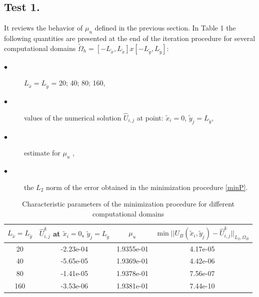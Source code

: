 \documentclass[12pt]{article}
\theoremstyle{theorem}
\theoremstyle{defi}
\begin{document}
\subsection{Test 1.}

It reviews the behavior of $\mu_u$  defined in the previous section. In Table 1 the following quantities are presented at the end of the iteration procedure for several computational domains $\tilde \Omega_h = [-L_{\tilde x}, L_{\tilde x}] x  [-L_{\tilde y}, L_{\tilde y}]$:

\begin{description}
  \item[$\bullet$ ] $ L_{\tilde x} = L_{\tilde y}$ = 20; 40; 80; 160,
  \item[$\bullet$]values of the numerical solution $\widehat{U}_{i,j}$  at point: $\tilde {x}_i = 0$, $ \tilde {y}_j =   L_{\tilde y}$, 
  \item[$\bullet$ ]estimate for $\mu_u$ , 
\item[$\bullet$ ] the $L_2$  norm of the error obtained in the minimization procedure  \ref{minP}. 
\end{description}

\begin{center}
\begin{table}[ht]
\centering
		\begin{tabular}{||c|| c | c | c ||}
			\hline
			\hline
      $ L_{\tilde x} = L_{\tilde y}$        &         $\widehat{U}_{i,j}^k$ at  $\tilde {x}_i = 0$, $ \tilde {y}_j =   L_{\tilde y}$    &    $\mu_u$  &    $\min|| U_B( \tilde x_i, \tilde y_j) - \widehat U ^k_{i,j} ||_{L_2,\Omega_B}$\\
   			\hline 
			\hline 
      20    & -2.23e-04    &  1.9355e-01  &     4.17e-05  \\
               	 \hline 
    40      & -5.65e-05   &   1.9369e-01    &    4.42e-06 \\
			\hline 	
      80    & -1.41e-05  &      1.9378e-01      &       7.56e-07  \\
			\hline 	
     160     & -3.53e-06  &    1.9381e-01        &     7.44e-10 \\
		   \hline
	             \hline 
                     \end{tabular}
\caption{Characteristic parameters of the minimization procedure for different computational domains}

\label{tab:fourth-der}
\end{table}
\end{center}
\end{document}
